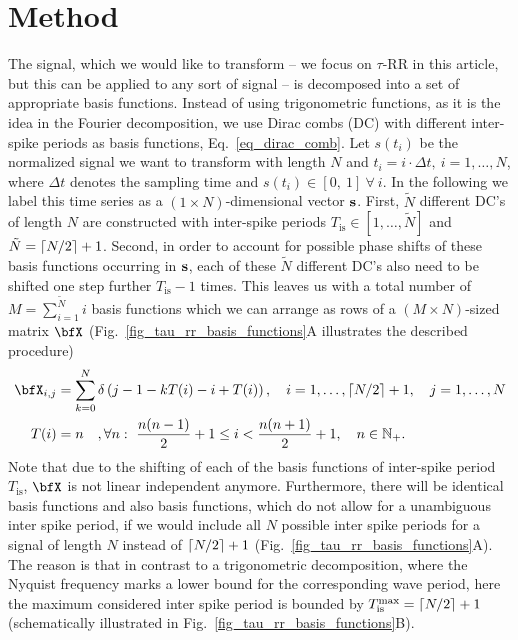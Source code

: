 \section{Method}\label{sec_tau_rr_method}
    
The signal, which we would like to transform -- we focus on $\tau$-RR in this article, but this can be applied to any sort of signal -- 
is decomposed into a set of appropriate basis functions. Instead of using trigonometric functions, as it is the idea in the Fourier decomposition, we use Dirac combs (DC) with 
different inter-spike periods as basis functions, Eq.~\eqref{eq_dirac_comb}. Let $s(t_i)$ be the normalized signal we want to transform with length $N$ and 
$t_i=i\cdot \Delta t,~i=1,\ldots,N$, where $\Delta t$ denotes the sampling time and $s(t_i) \in [0,\ 1]\ \forall\ i$. In the following we label this time series as a $(1\times N)$-dimensional 
vector $\bf{s}$. 
First, $\tilde{N}$ different DC's of length $N$ are constructed with inter-spike periods $T_\text{is} \in [1,\ldots,\tilde{N}]$ and $\tilde{N}=\ceil*{N/2}+1$. Second, in order to account 
for possible phase shifts of 
these basis functions occurring in $\bf{s}$, each of these $\tilde{N}$ different DC's also need to be shifted one step further $T_\text{is}-1$ times. This leaves us with a total number of 
$M = \sum_{i=1}^{\tilde{N}}i$ 
basis functions which we can arrange as rows of a $(M\times N)$-sized matrix $\bfX$
(Fig.~\ref{fig_tau_rr_basis_functions}A illustrates the described procedure)
\begin{align}
\bfX_{i,j} &= \sum_{k=0}^{N}\delta\left(j-1-kT(i)-i+T(i) \right), \quad i=1,\dots,\ceil*{N/2}+1, \quad j=1,\dots,N\\
T(i)&= n \quad, \forall n:~ \frac{n(n-1)}{2} + 1 \leq i <  \frac{n(n+1)}{2} + 1,\quad n \in \mathbb{N}_+.
\label{eq_basis_matrix}
\end{align}
Note that due to the shifting of each of the basis functions of inter-spike period $T_\text{is}$, $\bfX$ is not linear independent anymore. 
Furthermore, there will be identical basis functions and also basis functions, which do not allow for a unambiguous inter spike period, 
if we would include all $N$ possible inter spike periods for a signal of length $N$ instead of $\ceil*{N/2}+1$ (Fig.~\ref{fig_tau_rr_basis_functions}A). 
The reason is that in contrast to a trigonometric decomposition, where the Nyquist frequency marks a lower bound for the corresponding wave period, here 
the maximum considered inter spike period is bounded by $T_{\text{is}}^{\text{max}} = \ceil*{N/2}+1$ (schematically illustrated in 
Fig.~\ref{fig_tau_rr_basis_functions}B).\\ 

